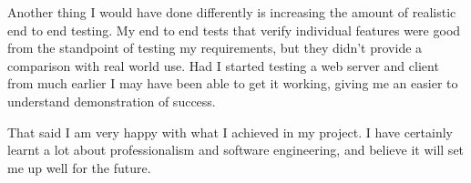 \documentclass[12pt,a4paper,twoside,openright]{report}
\begin{document}
\bigskip

Another thing I would have done differently is increasing the amount of realistic end to end testing.  My end to end tests that verify individual features were good from the standpoint of testing my requirements, but they didn't provide a comparison with real world use.  Had I started testing a web server and client from much earlier I may have been able to get it working, giving me an easier to understand demonstration of success.

\bigskip

That said I am very happy with what I achieved in my project. I have certainly learnt a lot about professionalism and software engineering, and believe it will set me up well for the future.

\end{document}
